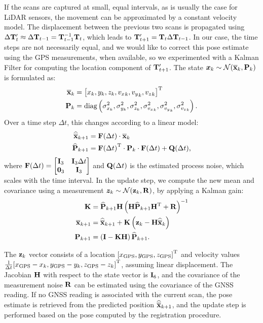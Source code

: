 If the scans are captured at small, equal intervals, as is usually the case for LiDAR sensors, the movement can be approximated by a constant velocity model. The displacement between the previous two scans is propagated using
$\Delta \mathbf{T}_{t}' \approx \Delta \mathbf{T}_{t-1} = \mathbf{T}_{t-1}^{-1}\mathbf{T}_{t}$, which leads to
$\mathbf{T}_{t+1}' = \mathbf{T}_{t} \Delta \mathbf{T}_{t-1}$. In our case, the time steps are not necessarily equal, and we would like to correct this pose estimate using the GPS measurements, when available, so we experimented with a Kalman Filter for computing the location component of $\mathbf{T}_{t+1}'$. The state $\bm{x}_k \sim \mathcal{N}(\overline{\mathbf{x}}_{k}, \mathbf{P}_{k}) $ is formulated as:
\begin{align}
	\overline{\mathbf{x}}_{k} & = {\left[x_k, y_k, z_k, {v_x}_k, {v_y}_k, {v_z}_k\right]}^\text{T}                                                \\
	\mathbf{P}_{k} & = \text{diag}\left(\sigma^2_{x_k}, \sigma^2_{y_k}, \sigma^2_{z_k}, \sigma^2_{{v_x}_k}, \sigma^2_{{v_y}_k}, \sigma^2_{{v_z}_k}\right)\text{.}
\end{align}
Over a time step $\Delta t$, this changes according to a linear model:
\newcommand{\Fdt}{\matx{F}(\Delta t)}
\newcommand{\Qdt}{\matx{Q}(\Delta t)}
\begin{align}
	\kfxpred{k+1} & =  \Fdt \cdot \kfx{k}                              \\
	\kfPpred{k+1} & = \transpose{\Fdt} \cdot \kfP{k} \cdot \Fdt + \Qdt
	\comma
\end{align}
where
$
	\Fdt =
	\begin{bmatrix}
		\matx{I}_3 & \matx{I}_3 \Delta t \\
		\matx{0}_3 & \matx{I}_3
	\end{bmatrix}
$ and $\Qdt$ is the estimated process noise, which scales with the time interval. In the update step, we compute the new mean and covariance using a measurement $\bm{z}_k \sim \mathcal{N}(\mathbf{z}_k, \mathbf{R})$, by applying a Kalman gain:
\begin{align}
	\mathbf{K}  & = \widehat{\mathbf{P}}_{k+1} \mathbf{H} \left(\mathbf{H} \widehat{\mathbf{P}}_{k+1} {\mathbf{H}}^\text{T} + \mathbf{R}\right)^{-1} \\
	\overline{\mathbf{x}}_{k+1} & = \widehat{\overline{\mathbf{x}}}_{k+1} + \mathbf{K} \left(\mathbf{z}_k - \mathbf{H}\widehat{\overline{\mathbf{x}}}_{k} \right)                         \\
	\mathbf{P}_{k+1} & = \left(\mathbf{I} - \mathbf{K} \mathbf{H}\right) \widehat{\mathbf{P}}_{k+1}
	\text{.}
\end{align}

The $\mathbf{z}_k$ vector consists of a location ${\left[x_\text{GPS}, y_\text{GPS}, z_\text{GPS}\right]}^\text{T}$ and velocity values $\frac{1}{\Delta t}{\left[x_\text{GPS} - x_k, y_\text{GPS} - y_k, z_\text{GPS} - z_k\right]}^\text{T}$, assuming linear displacement. The Jacobian $\mathbf{H}$ with respect to the state vector is $\mathbf{I}_6$, and the covariance of the measurement noise $\mathbf{R}$ can be estimated using the covariance of the GNSS reading. If no GNSS reading is associated with the current scan, the pose estimate is retrieved from the predicted position $\widehat{\overline{\mathbf{x}}}_{k+1}$, and the update step is performed based on the pose computed by the registration procedure.

